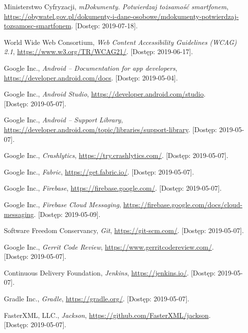 \documentclass{pracamgr}
\begin{document}
\begin{thebibliography}{99}
 Ministerstwo Cyfryzacji, \textit{mDokumenty. Potwierdzaj tożsamość smartfonem},\\ \url{https://obywatel.gov.pl/dokumenty-i-dane-osobowe/mdokumenty-potwierdzaj-tozsamosc-smartfonem}. [Dostęp: 2019-07-18].

 World Wide Web Consortium, \textit{Web Content Accessibility Guidelines (WCAG) 2.1},
\url{https://www.w3.org/TR/WCAG21/}. [Dostęp: 2019-06-17].

 Google Inc., \textit{Android -- Documentation for app developers},
	 \url{https://developer.android.com/docs}. [Dostęp: 2019-05-04].

 Google Inc., \textit{Android Studio},
	\url{https://developer.android.com/studio}. \\ 
	{[Dostęp: 2019-05-07]}.

 Google Inc., \textit{Android -- Support Library},
	\url{https://developer.android.com/topic/libraries/support-library}. [Dostęp: 2019-05-07].

 Google Inc., \textit{Crashlytics}, \url{https://try.crashlytics.com/}. [Dostęp: 2019-05-07].

 Google Inc., \textit{Fabric}, \url{https://get.fabric.io/}. [Dostęp: 2019-05-07].

 Google Inc., \textit{Firebase}, \url{https://firebase.google.com/}. [Dostęp: 2019-05-07].

 Google Inc., \textit{Firebase Cloud Messaging},
	\url{https://firebase.google.com/docs/cloud-messaging}. [Dostęp: 2019-05-09].

 Software Freedom Conservancy, \textit{Git},
	\url{https://git-scm.com/}. [Dostęp: 2019-05-07].

 Google Inc., \textit{Gerrit Code Review},
	\url{https://www.gerritcodereview.com/}.\\
	{[Dostęp: 2019-05-07]}.

 Continuous Delivery Foundation, \textit{Jenkins},
	\url{https://jenkins.io/}. [Dostęp: 2019-05-07].

 Gradle Inc., \textit{Gradle}, \url{https://gradle.org/}. [Dostęp: 2019-05-07].

 FasterXML, LLC., \textit{Jackson},
	\url{https://github.com/FasterXML/jackson}.\\
	{[Dostęp: 2019-05-07]}.


\end{thebibliography}
\end{document}
